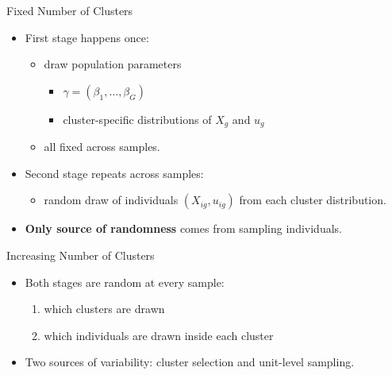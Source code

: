 \documentclass[
  ignorenonframetext,
]{beamer}
\providecommand{\tightlist}{%
  \setlength{\itemsep}{0pt}\setlength{\parskip}{0pt}}
\begin{document}
\begin{frame}{Fixed Number of Clusters}
\label{fixed-number-of-clusters}
\begin{itemize}
\tightlist
\item
  First stage happens once:

  \begin{itemize}
  \tightlist
  \item
    draw population parameters

    \begin{itemize}
    \tightlist
    \item
      \(\gamma = (\beta_1,\dots,\beta_G)\)\\
    \item
      cluster-specific distributions of \(X_g\) and \(u_g\)\\
    \end{itemize}
  \item
    all fixed across samples.\\
  \end{itemize}
\item
  Second stage repeats across samples:

  \begin{itemize}
  \tightlist
  \item
    random draw of individuals \((X_{ig}, u_{ig})\) from each cluster
    distribution.\\
  \end{itemize}
\item
  \textbf{Only source of randomness} comes from sampling individuals.
\end{itemize}
\end{frame}

\begin{frame}{Increasing Number of Clusters}
\label{increasing-number-of-clusters}
\begin{itemize}
\tightlist
\item
  Both stages are random at every sample:

  \begin{enumerate}
  \tightlist
  \item
    which clusters are drawn\\
  \item
    which individuals are drawn inside each cluster\\
  \end{enumerate}
\item
  Two sources of variability: cluster selection and unit-level sampling.
\end{itemize}
\end{frame}
\end{document}

